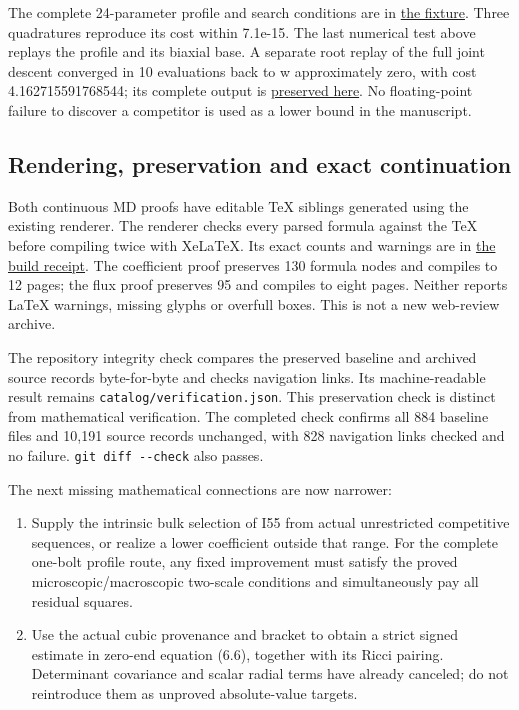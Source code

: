\documentclass[
  10pt,
]{article}
\providecommand{\tightlist}{%
  \setlength{\itemsep}{0pt}\setlength{\parskip}{0pt}}
\begin{document}
The complete 24-parameter profile and search conditions are in
\href{computations/20260928_coupled_negative_mode.json}{the fixture}.
Three quadratures reproduce its cost within 7.1e-15. The last numerical
test above replays the profile and its biaxial base. A separate root
replay of the full joint descent converged in 10 evaluations back to w
approximately zero, with cost 4.162715591768544; its complete output is
\href{computations/20260928_coupled_negative_mode_joint.json}{preserved
here}. No floating-point failure to discover a competitor is used as a
lower bound in the manuscript.

\hypertarget{rendering-preservation-and-exact-continuation}{%
\subsection{Rendering, preservation and exact
continuation}\label{rendering-preservation-and-exact-continuation}}

Both continuous MD proofs have editable TeX siblings generated using the
existing renderer. The renderer checks every parsed formula against the
TeX before compiling twice with XeLaTeX. Its exact counts and warnings
are in \href{20260928_localization_render.json}{the build receipt}. The
coefficient proof preserves 130 formula nodes and compiles to 12 pages;
the flux proof preserves 95 and compiles to eight pages. Neither reports
LaTeX warnings, missing glyphs or overfull boxes. This is not a new
web-review archive.

The repository integrity check compares the preserved baseline and
archived source records byte-for-byte and checks navigation links. Its
machine-readable result remains \nolinkurl{catalog/verification.json}. This
preservation check is distinct from mathematical verification. The
completed check confirms all 884 baseline files and 10,191 source
records unchanged, with 828 navigation links checked and no failure.
\texttt{git\ diff\ -\/-check} also passes.

The next missing mathematical connections are now narrower:

\begin{enumerate}
\def\labelenumi{\arabic{enumi}.}
\tightlist
\item
  Supply the intrinsic bulk selection of I55 from actual unrestricted
  competitive sequences, or realize a lower coefficient outside that
  range. For the complete one-bolt profile route, any fixed improvement
  must satisfy the proved microscopic/macroscopic two-scale conditions
  and simultaneously pay all residual squares.
\item
  Use the actual cubic provenance and bracket to obtain a strict signed
  estimate in zero-end equation (6.6), together with its Ricci pairing.
  Determinant covariance and scalar radial terms have already canceled;
  do not reintroduce them as unproved absolute-value targets.
\end{enumerate}
\end{document}
